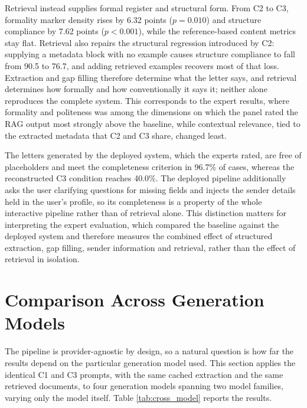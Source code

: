 \documentclass[12pt]{uomthesis}
\begin{document}
Retrieval instead supplies formal register and structural form. From C2 to C3, formality marker density rises by 6.32 points ($p = 0.010$) and structure compliance by 7.62 points ($p < 0.001$), while the reference-based content metrics stay flat. Retrieval also repairs the structural regression introduced by C2: supplying a metadata block with no example causes structure compliance to fall from 90.5 to 76.7, and adding retrieved examples recovers most of that loss. Extraction and gap filling therefore determine what the letter says, and retrieval determines how formally and how conventionally it says it; neither alone reproduces the complete system. This corresponds to the expert results, where formality and politeness was among the dimensions on which the panel rated the RAG output most strongly above the baseline, while contextual relevance, tied to the extracted metadata that C2 and C3 share, changed least.

The letters generated by the deployed system, which the experts rated, are free of placeholders and meet the completeness criterion in 96.7\% of cases, whereas the reconstructed C3 condition reaches 40.0\%. The deployed pipeline additionally asks the user clarifying questions for missing fields and injects the sender details held in the user's profile, so its completeness is a property of the whole interactive pipeline rather than of retrieval alone. This distinction matters for interpreting the expert evaluation, which compared the baseline against the deployed system and therefore measures the combined effect of structured extraction, gap filling, sender information and retrieval, rather than the effect of retrieval in isolation.

\section{Comparison Across Generation Models}
\label{sec:cross_model}

The pipeline is provider-agnostic by design, so a natural question is how far the results depend on the particular generation model used. This section applies the identical C1 and C3 prompts, with the same cached extraction and the same retrieved documents, to four generation models spanning two model families, varying only the model itself. Table \ref{tab:cross_model} reports the results.
\end{document}

